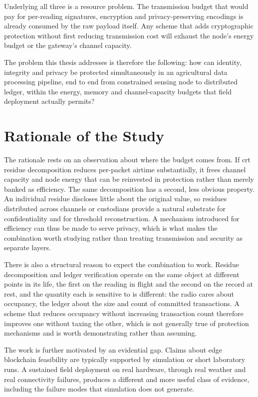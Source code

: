 \documentclass[12pt,a4paper,oneside]{book}
\begin{document}
Underlying all three is a resource problem. The transmission budget that would
pay for per-reading signatures, encryption and privacy-preserving encodings is
already consumed by the raw payload itself. Any scheme that adds cryptographic
protection without first reducing transmission cost will exhaust the node's
energy budget or the gateway's channel capacity.

The problem this thesis addresses is therefore the following: how can identity,
integrity and privacy be protected simultaneously in an agricultural data
processing pipeline, end to end from constrained sensing node to distributed
ledger, within the energy, memory and channel-capacity budgets that field
deployment actually permits?

\section{Rationale of the Study}
\label{sec:rationale}

The rationale rests on an observation about where the budget comes from. If
\gls{crt} residue decomposition reduces per-packet airtime substantially, it
frees channel capacity and node energy that can be reinvested in protection
rather than merely banked as efficiency. The same decomposition has a second,
less obvious property. An individual residue discloses little about the original
value, so residues distributed across channels or custodians provide a natural
substrate for confidentiality and for threshold reconstruction. A mechanism
introduced for efficiency can thus be made to serve privacy, which is what makes
the combination worth studying rather than treating transmission and security as
separate layers.

There is also a structural reason to expect the combination to work. Residue
decomposition and ledger verification operate on the same object at different
points in its life, the first on the reading in flight and the second on the
record at rest, and the quantity each is sensitive to is different: the radio
cares about occupancy, the ledger about the size and count of committed
transactions. A scheme that reduces occupancy without increasing transaction
count therefore improves one without taxing the other, which is not generally
true of protection mechanisms and is worth demonstrating rather than assuming.

The work is further motivated by an evidential gap. Claims about edge blockchain
feasibility are typically supported by simulation or short laboratory runs. A
sustained field deployment on real hardware, through real weather and real
connectivity failures, produces a different and more useful class of evidence,
including the failure modes that simulation does not generate.
\end{document}
